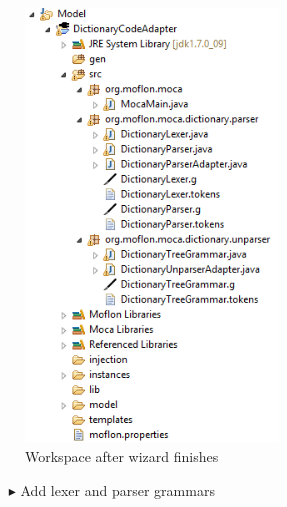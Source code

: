 \begin{figure}[htp]
\begin{center}
 \includegraphics[width=0.6\textwidth]{pics/moca/2TextToMocaTree/3-WizardResult}
  \caption{Workspace after wizard finishes}
  \label{moca-3-WizardResult}
\end{center}
\end{figure}

\begin{enumerate}
\item[$\blacktriangleright$] Add lexer and parser grammars 
\end{enumerate}
 
